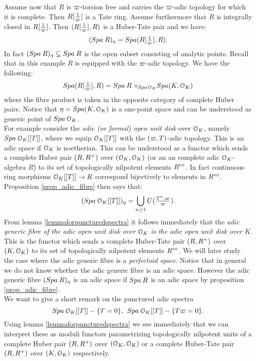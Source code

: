 Assume now that $R$ is $\varpi$-torsion free and carries the $\varpi$-adic topology for which it is complete. Then $R[\tfrac{1}{\varpi}]$ is a Tate ring.
Assume furthermore that $R$ is integrally closed in $R[\tfrac{1}{\varpi}]$.
Then $(R[\tfrac{1}{\varpi}], R)$ is a Huber-Tate pair and we have:
\[({Spa{\:R}})_{\eta} = {Spa({R[\tfrac{1}{\varpi}]},{R})}.\]
In fact $({Spa{\:R}})_{\eta}\subseteq{Spa{\:R}}$ is the open subset consisting of analytic points.
Recall that in this example $R$ is equipped with the $\varpi$-adic topology.
We have the following:
\[{Spa({R[\tfrac{1}{\varpi}]},{R})} = {Spa{\:R}}\times\!\!_{{Spa{\:\!\mathcal{O}_K}}}{Spa({K},{\mathcal{O}_K})}\]
where the fibre product is taken in the opposite category of complete Huber pairs.
Notice that $\eta={Spa({K},{\mathcal{O}_K})}$ is a one-point space and can be understood as generic point of ${Spa{\:\mathcal{O}_K}}$.\\

For example consider the \emph{adic (or formal) open unit disk} over $\mathcal{O}_K$, namely ${Spa{\:\mathcal{O}_K[[T]]}}$, where we equip $\mathcal{O}_K[[T]]$ with the $(\varpi, T)$-adic topology. This is an adic space if $\mathcal{O}_K$ is noetherian.
This can be understood as a functor which sends a complete Huber pair $(R, R{^{+}})$ over $(\mathcal{O}_K, \mathcal{O}_K)$ (or an an complete adic $\mathcal{O}_K$-algebra $R$\.) to its set of topologically nilpotent elements $R^{\circ\circ}$.  In fact continuous ring morphisms $\mathcal{O}_K[[T]]\to R$ correspond bijectively to elements in $R^{\circ\circ}$.
Proposition \ref{prop_adic_fibre} then says that:
\[({Spa{\:\mathcal{O}_K[[T]]}})_{\eta} = \bigcup\limits_{n\geq1}U(\tfrac{T^n,\varpi}{\varpi}).\]
From lemma \ref{lemmaforpuncturedspectra} it follows immediately that the \emph{adic generic fibre of the adic open unit disk over} $\mathcal{O}_K$ \emph{is the adic open unit disk over} $K$. This is the functor which sends  a complete Huber-Tate pair $(R, R{^{+}})$ over $(K, \mathcal{O}_K)$ to its set of topologically nilpotent elements $R^{\circ\circ}$.
We will later study the case where the adic generic fibre is a \emph{perfectoid space}.
Notice that in general we do not know whether the adic generic fibre is an adic space. However the adic generic fibre $({Spa{\:R}})_{\eta}$ is an adic space if ${Spa{\:R}}$ is an adic space by proposition \ref{prop_adic_fibre}.
\\

We want to give a short remark on the punctured adic spectra 
\[{Spa{\:\mathcal{O}_K[[T]]}}-\{T=0\},\:\: {Spa{\:\mathcal{O}_K[[T]]}}-\{T\varpi=0\}.\] 
Using lemma \ref{lemmaforpuncturedspectra} we see immediately that we can interpret these as moduli functors parametrizing topologically nilpotent units of a complete Huber pair $(R, R{^{+}})$ over $(\mathcal{O}_K, \mathcal{O}_K)$ or a complete Huber-Tate pair $(R, R{^{+}})$ over $(K, \mathcal{O}_K)$ respectively.
\\

